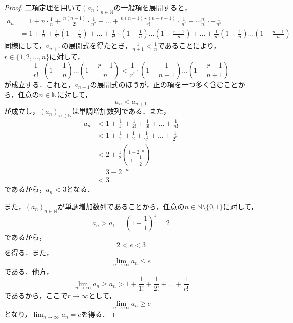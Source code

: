 \documentclass[uplatex,dvipdfmx,a4paper,10pt,fleqn]{jsarticle}
\begin{document}
\begin{tleftbar}
	\begin{proof}
		二項定理を用いて$(a_n)_{n \in \mathbb{N}}$の一般項を展開すると，
		\begin{align*}
			a_n & =  1 + n \cdot \frac{1}{n} + \frac{n(n-1)}{2!} \cdot \frac{1}{n^2} + \dots + \frac{n(n-1)\cdots(n-r+1)}{r!} \cdot \frac{1}{n^r} + \cdots \frac{n!}{n!} \cdot + \frac{1}{n^n} \\
            & = 1+ \frac{1}{1!} + \frac{1}{2!} \left(1- \frac{1}{n} \right) + \dots + \frac{1}{r!} \cdot  \left(1 - \frac{1}{n} \right) \dots \left (1-\frac{r-1}{n} \right) + \dots +  \frac{1}{n!} \left(1 - \frac{1}{n} \right) \dots \left(1- \frac{n-1}{n} \right)
        \end{align*}
		同様にして，$a_{n+1}$の展開式を得たとき，$ \frac{1}{n+1} < \frac{1}{n}$であることにより，$r\in \{ 1,2,\dots ,n\}$に対して，
		\[
			\frac{1}{r!} \cdot  \left(1 - \frac{1}{n} \right) \dots \left (1-\frac{r-1}{n} \right) < \frac{1}{r!} \cdot  \left(1 - \frac{1}{n+1} \right) \dots \left (1-\frac{r-1}{n+1} \right)
		\]
		が成立する．これと，$a_{n+1}$の展開式のほうが，正の項を一つ多く含むことから，任意の$n \in \mathbb{N}$に対して，
		\[
			a_{n} < a_{n+1}
		\]
		が成立し，$(a_n)_{n \in \mathbb{N}}$は単調増加数列である．また，
		\begin{align*}
			\label{p32 問2 2}
			a_n &< 1 + \frac{1}{1!} + \frac{1}{2!} +\frac{1}{3!} + \dots + \frac{1}{n!} \\
			& <  1 + \frac{1}{1!} + \frac{1}{2}+ \frac{1}{2^2} + \dots + \frac{1}{2^n} \\
			& <  2 + \frac{1}{2} \left( \frac{ 1 - 2^{-n} }{ 1- \dfrac{1}{2} } \right)\\
			& =  3-2^{-n} \\
			& <  3
		\end{align*}
		であるから，$a_n < 3$となる．
        
        また，$(a_n)_{n \in \mathbb{N}}$が単調増加数列であることから，任意の$n \in \mathbb{N} \setminus \{0,1\}$に対して，
		\[
			a_n > a_1 = \left(1+\frac{1}{1}\right)^1 =2
		\]
		であるから，
        \[
            2<e<3
        \]
        を得る．また，
		\[
			\lim_{n \to \infty} a_n \le e
		\]
		である．他方，
		\[
			\lim_{n \to \infty} a_n \ge a_n > 1 + \frac{1}{1!} + \frac{1}{2!} + \dots + \frac{1}{r!}
		\]
		であるから，ここで$r \to \infty$として，
		\[
			\lim_{n \to \infty} a_n \ge e
		\]
		となり，$\lim_{n \to \infty} a_n =e$を得る．
	\end{proof}
\end{tleftbar}
\end{document}
